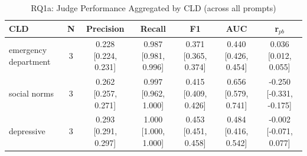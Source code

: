 \begin{table}[htbp]
\centering
\caption{RQ1a: Judge Performance Aggregated by CLD (across all prompts)}
\label{tab:rq1a_by_cld}
\begin{tabular}{lcccccc}
\toprule
\textbf{CLD} & \textbf{N} & \textbf{Precision} & \textbf{Recall} & \textbf{F1} & \textbf{AUC} & \textbf{r$_{pb}$} \\
\midrule
emergency department & 3 & 0.228 [0.224, 0.231] & 0.987 [0.981, 0.996] & 0.371 [0.365, 0.374] & 0.440 [0.426, 0.454] & 0.036 [0.012, 0.055] \\
social norms & 3 & 0.262 [0.257, 0.271] & 0.997 [0.962, 1.000] & 0.415 [0.409, 0.426] & 0.656 [0.579, 0.741] & -0.250 [-0.331, -0.175] \\
depressive & 3 & 0.293 [0.291, 0.297] & 1.000 [1.000, 1.000] & 0.453 [0.451, 0.458] & 0.484 [0.416, 0.542] & -0.002 [-0.071, 0.077] \\
\bottomrule
\end{tabular}
\end{table}